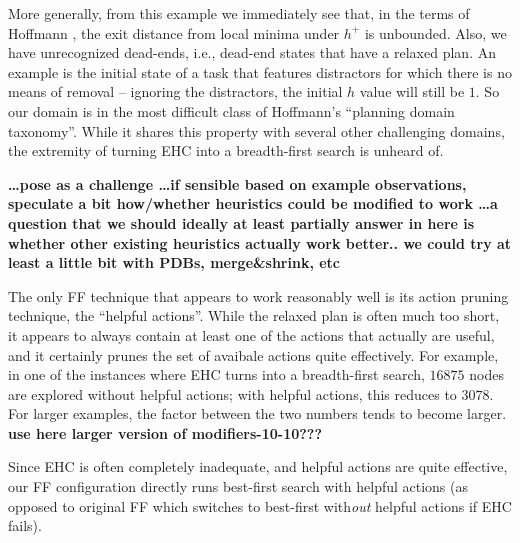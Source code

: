 


More generally, from this example we immediately see that, in the
terms of Hoffmann , the exit distance from
local minima under $h^+$ is unbounded. Also, we have unrecognized
dead-ends, i.e., dead-end states that have a relaxed plan. An example
is the initial state of a task that features distractors for which
there is no means of removal -- ignoring the distractors, the initial
$h$ value will still be $1$. So our domain is in the most difficult
class of Hoffmann's  ``planning domain
taxonomy''. While it shares this property with several other
challenging domains, the extremity of turning EHC into a breadth-first
search is unheard of.



{\bf \dots pose as a challenge \dots if sensible based on example
  observations, speculate a bit how/whether heuristics could be
  modified to work \dots a question that we should ideally at least
  partially answer in here is whether other existing heuristics
  actually work better.. we could try at least a little bit with PDBs,
  merge\&shrink, etc}



The only FF technique that appears to work reasonably well is its
action pruning technique, the ``helpful actions''. While the relaxed
plan is often much too short, it appears to always contain at least
one of the actions that actually are useful, and it certainly prunes
the set of avaibale actions quite effectively. For example, in one of
the instances where EHC turns into a breadth-first search, $16875$
nodes are explored without helpful actions; with helpful actions, this
reduces to $3078$. For larger examples, the factor between the two
numbers tends to become larger. {\bf use here larger version of
  modifiers-10-10???}



Since EHC is often completely inadequate, and helpful actions are
quite effective, our FF configuration directly runs best-first search
with helpful actions (as opposed to original FF which switches to
best-first with{\em out} helpful actions if EHC fails).


